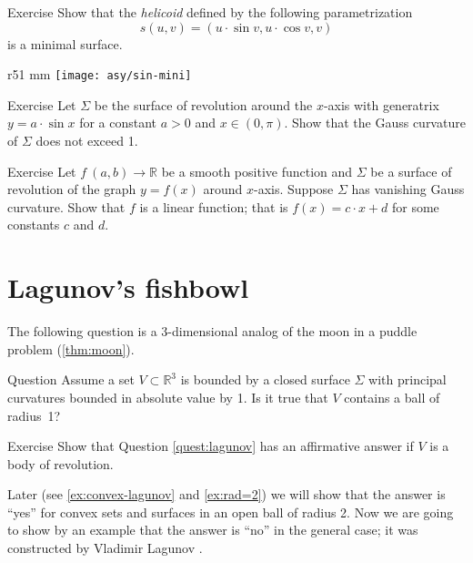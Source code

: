 \begin{thm}{Exercise}\label{ex:helicoid-is-minimal}
Show that the \emph{helicoid} defined by the following parametrization
\[s(u,v)=(u\cdot \sin v,u\cdot \cos v,v)\]
is a minimal surface.
\end{thm}

\begin{wrapfigure}{r}{51 mm}
\vskip-6mm
\centering
\texttt{[image: asy/sin-mini]}
\vskip0mm
\end{wrapfigure}

\begin{thm}{Exercise}\label{ex:rev(sin)}
Let $\Sigma$ be the surface of revolution around the $x$-axis
with generatrix $y=a\cdot \sin x$ for a constant $a>0$ and $x\in (0,\pi)$.
Show that the Gauss curvature of $\Sigma$ does not exceed 1.
\end{thm}

\begin{thm}{Exercise}\label{ex:rev(lin)}
Let $f\:(a,b)\to\mathbb{R}$ be a smooth positive function and $\Sigma$ be a surface of revolution of the graph $y=f(x)$ around $x$-axis.
Suppose $\Sigma$ has vanishing Gauss curvature.
Show that $f$ is a linear function; that is $f(x)=c\cdot x+d$ for some constants $c$ and $d$.
\end{thm}

\section{Lagunov's fishbowl}

The following question is a 3-dimensional analog of the moon in a puddle problem (\ref{thm:moon}).

\begin{thm}{Question}\label{quest:lagunov}
Assume a set $V\subset \mathbb{R}^3$ is bounded by a closed surface $\Sigma$ with 
principal curvatures bounded in absolute value by 1.
Is it true that $V$ contains a ball of radius~1?
\end{thm}

\begin{thm}{Exercise}\label{ex:moon-revolution}
Show that Question \ref{quest:lagunov} has an affirmative answer if $V$ is a body of revolution.
\end{thm}

Later (see \ref{ex:convex-lagunov} and \ref{ex:rad=2})
we will show that the answer is ``yes'' for convex sets and surfaces in an open ball of radius 2.
Now we are going to show by an example that the answer is ``no'' in the general case;
it was constructed by Vladimir Lagunov \cite{lagunov-1961}.

